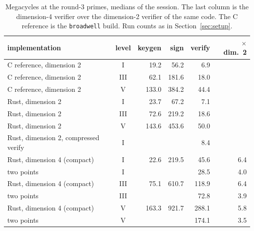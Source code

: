 \documentclass[version=preprint]{iacrcc}
\begin{document}
    \begin{table}[t]
        \centering
        \caption{Megacycles at the round-3 primes, medians of the session. The
            last column is the dimension-4 verifier over the dimension-2 verifier of
            the same code. The C reference is the \texttt{broadwell} build.
            Run counts as in Section~\ref{sec:setup}.}
        \label{tab:cycles}
        \begin{tabular}{l c r r r r}
            \toprule
            implementation & level & keygen & sign & verify & $\times$ dim.\ 2 \\
            \midrule
            C reference, dimension 2 & I   & 19.2 & 56.2 & 6.9 & \\
            C reference, dimension 2 & III & 62.1 & 181.6 & 18.0 & \\
            C reference, dimension 2 & V   & 133.0 & 384.2 & 44.4 & \\
            Rust, dimension 2 & I   & 23.7 & 67.2 & 7.1 & \\
            Rust, dimension 2 & III & 72.6 & 219.2 & 18.6 & \\
            Rust, dimension 2 & V   & 143.6 & 453.6 & 50.0 & \\
            Rust, dimension 2, compressed verify & I & & & 8.4 & \\
            Rust, dimension 4 (compact) & I & 22.6 & 219.5 & 45.6 & 6.4 \\
            \quad two points & I & & & 28.5 & 4.0 \\
            Rust, dimension 4 (compact) & III & 75.1 & 610.7 & 118.9 & 6.4 \\
            \quad two points & III & & & 72.8 & 3.9 \\
            Rust, dimension 4 (compact) & V & 163.3 & 921.7 & 288.1 & 5.8 \\
            \quad two points & V & & & 174.1 & 3.5 \\
            \bottomrule
        \end{tabular}
    \end{table}
\end{document}
